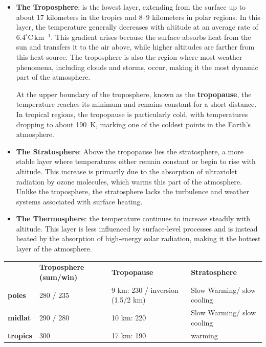 \begin{itemize}
    \item \textbf{The Troposphere}: is the lowest layer, extending from the surface up to about 17 kilometers in the tropics and 8--9 kilometers in polar regions. In this layer, the temperature generally decreases with altitude at an average rate of $6.4^\circ \mathrm{C \, km^{-1}}$. This gradient arises because the surface absorbs heat from the sun and transfers it to the air above, while higher altitudes are farther from this heat source. The troposphere is also the region where most weather phenomena, including clouds and storms, occur, making it the most dynamic part of the atmosphere.

At the upper boundary of the troposphere, known as the \textbf{tropopause}, the temperature reaches its minimum and remains constant for a short distance. In tropical regions, the tropopause is particularly cold, with temperatures dropping to about 190~K, marking one of the coldest points in the Earth's atmosphere.

\item \textbf{The Stratosphere}: Above the tropopause lies the stratosphere, a more stable layer where temperatures either remain constant or begin to rise with altitude. This increase is primarily due to the absorption of ultraviolet radiation by ozone molecules, which warms this part of the atmosphere. Unlike the troposphere, the stratosphere lacks the turbulence and weather systems associated with surface heating.

\item \textbf{The Thermosphere}:  the temperature continues to increase steadily with altitude. This layer is less influenced by surface-level processes and is instead heated by the absorption of high-energy solar radiation, making it the hottest layer of the atmosphere.

\end{itemize}

\begin{table}[h]
\begin{tabular}{llll}
                                                             & {\color[HTML]{010066} \textbf{Troposphere (sum/win)}} & {\color[HTML]{010066} \textbf{Tropopause}} & {\color[HTML]{010066} \textbf{Stratosphere}} \\ \cline{2-4} 
\multicolumn{1}{l|}{{\color[HTML]{003532} \textbf{poles}}}   & 280 / 235                                             & 9 km: 230 / inversion (1.5/2 km)           & Slow Warming/ slow cooling                   \\
\multicolumn{1}{l|}{{\color[HTML]{003532} \textbf{midlat}}}  & 290 / 280                                             & 10 km: 220                                 & Slow Warming/ slow cooling                   \\
\multicolumn{1}{l|}{{\color[HTML]{003532} \textbf{tropics}}} & 300                                                   & 17 km: 190                                 & warming                                     
\end{tabular}
\end{table}

